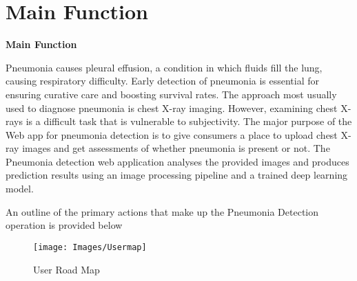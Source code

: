 %


\chapter{Main Function}

\textbf{Main Function}



Pneumonia causes pleural effusion, a condition in which fluids fill the lung, causing respiratory difficulty. Early detection of pneumonia is essential for ensuring curative care and boosting survival rates. The approach most usually used to diagnose pneumonia is chest X-ray imaging. However, examining chest X-rays is a difficult task that is vulnerable to subjectivity. The major purpose of the Web app for pneumonia detection is to give consumers a place to upload chest X-ray images and get assessments of whether pneumonia is present or not. The Pneumonia detection web application analyses the provided images and produces prediction results using an image processing pipeline and a trained deep learning model.


An outline of the primary actions that make up the Pneumonia Detection operation is provided below


	\begin{figure}[h!]
	\centering
	\texttt{[image: Images/Usermap]}
	\caption{User Road Map}
\end{figure}


